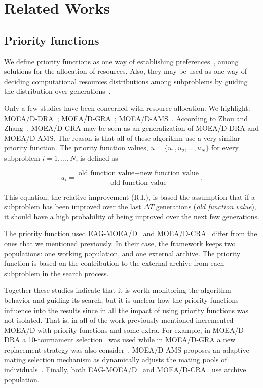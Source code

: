 \section{Related Works}

\subsection{Priority functions}

We define priority functions as one way of establishing preferences~\cite{chankong1983multiobjective},\cite{hansson2005decision} among solutions for the allocation of resources. Also, they may be used as one way of deciding computational resources distributions among subproblems by guiding the distribution over generations~\cite{cai2015external}. 

Only a few studies have been concerned with resource allocation. We highlight: MOEA/D-DRA~\cite{zhang2009performance}; MOEA/D-GRA~\cite{zhou2016all};  MOEA/D-AMS~\cite{chiang2011moea}. According to Zhou and Zhang~\cite{zhou2016all}, MOEA/D-GRA may be seen as an generalization of MOEA/D-DRA and MOEA/D-AMS. The reason is that all of these algorithm use a very similar priority function. The priority function values, $u = \{u_1, u_2, ..., u_N\}$ for every subproblem $i=1,...,N$, is  defined as

\begin{equation}\label{priority}
	u_i = \dfrac{\text{old function value}-\text{new function value}}{\text{old function value}}.
\end{equation}


This equation, the relative improvement (R.I.), is based the assumption that if a subproblem has been improved over the last $\Delta T$ generations (\textit{old function value}), it should have a high probability of being improved over the next few generations. 
	
The priority function used EAG-MOEA/D~\cite{cai2015external} and MOEA/D-CRA~\cite{kang2018collaborative} differ from the ones that we mentioned previously. In their case, the framework keeps two populations: one working population, and one external archive. The priority function is based on the contribution to the external archive from each subproblem in the search process. 

Together these studies indicate that it is worth monitoring the algorithm behavior and guiding its search, but it is unclear how the priority functions influence into the results since in all the impact of using priority functions was not isolated. That is, in all of the work previously mentioned incremented MOEA/D with priority functions and some extra. For example, in MOEA/D-DRA a 10-tournament selection~\cite{zhang2009performance} was used while in MOEA/D-GRA a new replacement strategy was also consider~\cite{zhou2016all}. MOEA/D-AMS proposes an adaptive mating selection mechanism as dynamically adjusts the mating pools of individuals~\cite{chiang2011moea}. Finally, both EAG-MOEA/D~\cite{cai2015external} and MOEA/D-CRA~\cite{kang2018collaborative} use archive population.


